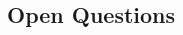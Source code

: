 \documentclass[twoside]{article}
\begin{document}
\begin{multicols}{2}

\section{Open Questions}

\printbibliography






\end{multicols}
\end{document}
